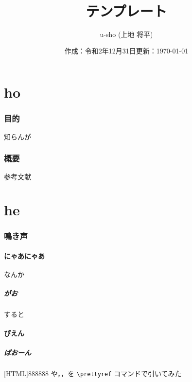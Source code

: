 \documentclass[uplatex,dvipdfmx]{u-sho_jsarticle}
\title{\upLaTeXe テンプレート} %
\author{u-sho (上地 将平)}
\date{作成：令和2年12月31日\hspace{2zw}更新：\和暦\today}%
\begin{document}
  \maketitle
  \tableofcontents

  \clearpage

  \part{ho}
    \section{目的}
      知らんが

    \section{概要}
      参考文献~\cite{キー1}

  \part{he}
    \section{鳴き声} %

      \subsection{にゃあにゃあ}
        なんか

      \subsubsection{\texorpdfstring{がお}{がおがお}}
        すると

      \subsection{ぴえん} %

      \subsubsection{ぱおーん}
        [HTML]{888888}{}
        や，，を \verb|\prettyref| コマンドで引いてみた

  \newpage
\end{document}
